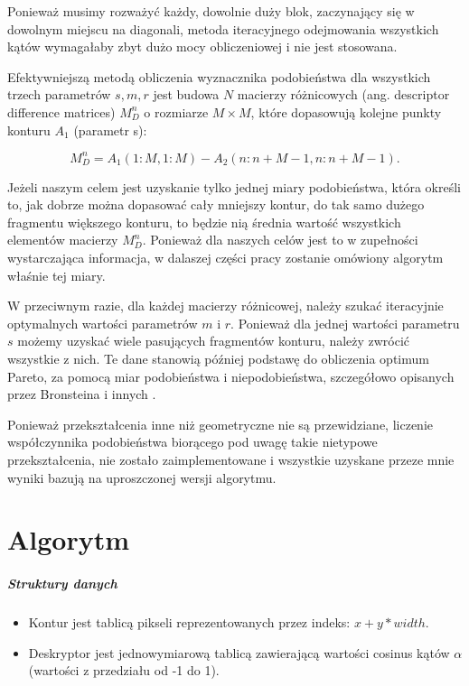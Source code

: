 
Ponieważ musimy rozważyć każdy, dowolnie duży blok, zaczynający się w dowolnym
miejscu na diagonali, metoda iteracyjnego odejmowania wszystkich kątów
wymagałaby zbyt dużo mocy obliczeniowej i nie jest stosowana.

Efektywniejszą metodą obliczenia wyznacznika podobieństwa dla wszystkich trzech
parametrów $s,m,r$ jest budowa $N$ macierzy różnicowych (ang. descriptor
difference matrices) $M_{D}^{n}$ o rozmiarze $M \times M$, które dopasowują
kolejne punkty konturu $A_{1}$ (parametr s):

\begin{equation}
  M_{D}^{n} = A_{1}(1: M, 1: M) - A_{2}(n: n+M-1, n:n+M-1).
\end{equation}

Jeżeli naszym celem jest uzyskanie tylko jednej miary podobieństwa, która
określi to, jak dobrze można dopasować cały mniejszy kontur, do tak samo dużego
fragmentu większego konturu, to będzie nią średnia wartość wszystkich elementów
macierzy $M_{D}^{n}$. Ponieważ dla naszych celów jest to w zupełności
wystarczająca informacja, w dalaszej części pracy zostanie omówiony algorytm
właśnie tej miary.

W przeciwnym razie, dla każdej macierzy różnicowej, należy szukać iteracyjnie
optymalnych wartości parametrów $m$ i $r$. Ponieważ dla jednej wartości
parametru $s$ możemy uzyskać wiele pasujących fragmentów konturu, należy
zwrócić wszystkie z nich. Te dane stanowią później podstawę do obliczenia
optimum Pareto, za pomocą miar podobieństwa i niepodobieństwa, szczegółowo
opisanych przez Bronsteina i innych \cite{partial_similarity}.

Ponieważ przekształcenia inne niż geometryczne nie są przewidziane, liczenie
współczynnika podobieństwa biorącego pod uwagę takie nietypowe przekształcenia,
nie zostało zaimplementowane i wszystkie uzyskane przeze mnie wyniki bazują na
uproszczonej wersji algorytmu.

\section{Algorytm}

\subparagraph{Struktury danych} 

\begin{itemize} \item Kontur jest tablicą pikseli reprezentowanych przez
    indeks: $x + y*width$. \item Deskryptor jest jednowymiarową tablicą
    zawierającą wartości cosinus kątów $\alpha$ (wartości z przedziału od -1 do 1).
\end{itemize}

